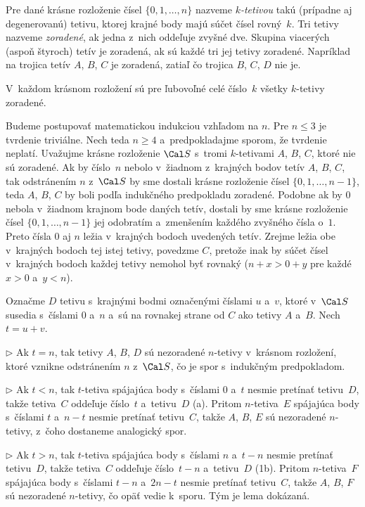 {%
Pre dané krásne rozloženie čísel $\{0,1,\dots,n\}$ nazveme {\it $k$-tetivou\/} takú (prípadne aj degenerovanú) tetivu, ktorej krajné body majú súčet čísel rovný~$k$. Tri tetivy nazveme {\it zoradené}, ak jedna z~nich oddeľuje zvyšné dve. Skupina viacerých (aspoň štyroch) tetív je zoradená, ak sú každé tri jej tetivy zoradené. Napríklad na \obr{} trojica tetív $A$, $B$, $C$ je zoradená, zatiaľ čo trojica $B$, $C$, $D$ nie je.
%

\Lema
V~každom krásnom rozložení sú pre ľubovoľné celé číslo~$k$ všetky $k$-tetivy zoradené.

\dokaz
Budeme postupovať matematickou indukciou vzhľadom na $n$. Pre $n\le 3$ je tvrdenie triviálne. Nech teda $n\ge4$ a~predpokladajme sporom, že tvrdenie neplatí. Uvažujme krásne rozloženie $\Cal S$ s~tromi $k$-tetivami $A$, $B$, $C$, ktoré nie sú zoradené. Ak by číslo~$n$ nebolo v~žiadnom z~krajných bodov tetív $A$, $B$, $C$, tak odstránením $n$ z~$\Cal S$ by sme dostali krásne rozloženie čísel $\{0,1,\dots,n-1\}$, teda $A$, $B$, $C$ by boli podľa indukčného predpokladu zoradené. Podobne ak by $0$ nebola v~žiadnom krajnom bode daných tetív, dostali by sme krásne rozloženie čísel $\{0,1,\dots,n-1\}$ jej odobratím a~zmenšením každého zvyšného čísla o~$1$. Preto čísla $0$ aj $n$ ležia v~krajných bodoch uvedených tetív. Zrejme ležia obe v~krajných bodoch tej istej tetivy, povedzme $C$, pretože inak by súčet čísel v~krajných bodoch každej tetivy nemohol byť rovnaký (${n+x}>0+y$ pre každé $x>0$ a~$y<n$).
%

Označme $D$ tetivu s~krajnými bodmi označenými číslami $u$ a~$v$, ktoré v~$\Cal S$ susedia s~číslami $0$ a~$n$ a~sú na rovnakej strane od $C$ ako tetivy $A$ a~$B$. Nech $t=u+v$.
\item{$\triangleright$}
Ak $t=n$, tak tetivy $A$, $B$, $D$ sú nezoradené $n$-tetivy v~krásnom rozložení, ktoré vznikne odstránením $n$ z~$\Cal S$, čo je spor s~indukčným predpokladom.
\item{$\triangleright$}
Ak $t<n$, tak $t$-tetiva spájajúca body s~číslami $0$ a~$t$ nesmie pretínať tetivu~$D$, takže tetiva~$C$ oddeľuje číslo~$t$ a~tetivu~$D$ (\obr a). Pritom $n$-tetiva~$E$ spájajúca body s~číslami $t$ a~$n-t$ nesmie pretínať tetivu~$C$, takže $A$, $B$, $E$ sú nezoradené $n$-tetivy, z~čoho dostaneme analogický spor.
\item{$\triangleright$}
Ak $t>n$, tak $t$-tetiva spájajúca body s~číslami $n$ a~$t-n$ nesmie pretínať tetivu~$D$, takže tetiva~$C$ oddeľuje číslo~$t-n$ a~tetivu~$D$ (\obrr1b). Pritom $n$-tetiva~$F$ spájajúca body s~číslami $t-n$ a~$2n-t$ nesmie pretínať tetivu~$C$, takže $A$, $B$, $F$ sú nezoradené $n$-tetivy, čo opäť vedie k~sporu.
\endgraf\noindent
Tým je lema dokázaná.

}
